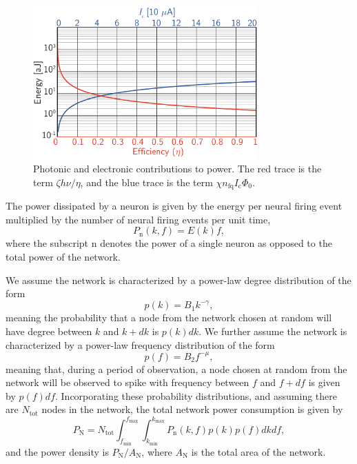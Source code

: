 \documentclass[aip,amsmath,amssymb,reprint,nofootinbib]{revtex4-1}
\begin{document}
\begin{figure}[t!]
	\centerline{\includegraphics[width=8.6cm]{_networks_contributionsToEnergy_small.pdf}}
	\caption{\label{fig:networks_contributionsToEnergy}Photonic and electronic contributions to power. The red trace is the term $\zeta h \nu/\eta$, and the blue trace is the term $\chi n_{\mathrm{fq}} I_{\mathrm{c}} \Phi_0$.}
\end{figure}

The power dissipated by a neuron is given by the energy per neural firing event multiplied by the number of neural firing events per unit time, 
\begin{equation}
\label{eq:neuronPower}
P_{\mathrm{n}}(k,f) = E(k)f, 
\end{equation}
where the subscript $\mathrm{n}$ denotes the power of a single neuron as opposed to the total power of the network. 

We assume the network is characterized by a power-law degree distribution of the form
\begin{equation}
\label{eq:degreeProbability}
p(k) = B_1 k^{-\gamma},
\end{equation} 
meaning the probability that a node from the network chosen at random will have degree between $k$ and $k+dk$ is $p(k)dk$. We further assume the network is characterized by a power-law frequency distribution of the form
\begin{equation}
\label{eq:frequencyProbability}
p(f) = B_2 f^{-\mu},
\end{equation}
meaning that, during a period of observation, a node chosen at random from the network will be observed to spike with frequency between $f$ and $f+df$ is given by $p(f)df$. Incorporating these probability distributions, and assuming there are $N_{\mathrm{tot}}$ nodes in the network, the total network power consumption is given by
\begin{equation}
\label{eq:networkAverageTotalPower}
P_{\mathrm{N}} = N_{\mathrm{tot}}\int_{f_{\mathrm{min}}}^{f_{\mathrm{max}}} \int_{k_{\mathrm{min}}}^{k_{\mathrm{max}}} P_{\mathrm{n}}(k,f)p(k)p(f) dk df, 
\end{equation}
and the power density is $P_{\mathrm{N}}/A_{\mathrm{N}}$, where $A_{\mathrm{N}}$ is the total area of the network.
\end{document}
